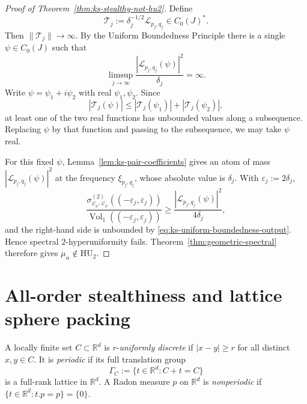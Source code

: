 \documentclass[11pt,reqno,a4paper]{amsart}
\numberwithin{equation}{section}
\theoremstyle{compact}
\theoremstyle{definition}
\theoremstyle{definition}
\newcommand{\HU}{\mathrm{HU}}
\newcommand{\Vol}{\operatorname{Vol}}
\begin{document}
\begin{proof}[Proof of Theorem~\ref{thm:ks-stealthy-not-hu2}]
Define
\begin{equation}\label{eq:ks-rescaled-functionals}
  \mathcal T_j
  :=\delta_j^{-1/2}\mathcal L_{p_j,q_j}
  \in C_0(J)^*.
\end{equation}
Then $\|\mathcal T_j\|\to\infty$.  By the Uniform Boundedness Principle
there is a single $\psi\in C_0(J)$ such that
\begin{equation}\label{eq:ks-uniform-boundedness-output}
  \limsup_{j\to\infty}
  \frac{|\mathcal L_{p_j,q_j}(\psi)|^2}{\delta_j}=\infty.
\end{equation}
Write $\psi=\psi_1+i\psi_2$ with real $\psi_1,\psi_2$.  Since
\[
  |\mathcal T_j(\psi)|
  \leq |\mathcal T_j(\psi_1)|+|\mathcal T_j(\psi_2)|,
\]
at least one of the two real functions has unbounded values along a
subsequence.  Replacing $\psi$ by that function and passing to the subsequence,
we may take $\psi$ real.

For this fixed $\psi$, Lemma~\ref{lem:ks-pair-coefficients} gives an atom of
mass $|\mathcal L_{p_j,q_j}(\psi)|^2$ at the frequency
$\xi_{p_j,q_j}$, whose absolute value is $\delta_j$.  With
$\varepsilon_j:=2\delta_j$,
\begin{equation}\label{eq:ks-normalized-pair-spectrum}
  \frac{\sigma^{(2)}_{\varphi_\psi,\varphi_\psi}
       ((-\varepsilon_j,\varepsilon_j))}
       {\Vol_1((-\varepsilon_j,\varepsilon_j))}
  \geq
  \frac{|\mathcal L_{p_j,q_j}(\psi)|^2}{4\delta_j},
\end{equation}
and the right-hand side is unbounded by
\eqref{eq:ks-uniform-boundedness-output}.  Hence spectral
$2$-hyperuniformity fails.  Theorem~\ref{thm:geometric-spectral} therefore
gives $\mu_\alpha\notin\HU_2$.
\end{proof}




\section{All-order stealthiness and lattice sphere packing}
\label{sec:all-order-stealthiness}

A locally finite set $C\subset\mathbb R^d$ is $r$-\emph{uniformly discrete}
if $|x-y|\geq r$ for all distinct $x,y\in C$.  It is \emph{periodic} if its
full translation group
\[
  \Gamma_C:=\{t\in\mathbb R^d:C+t=C\}
\]
is a full-rank lattice in $\mathbb R^d$.  A Radon measure $p$ on
$\mathbb R^d$ is \emph{nonperiodic} if
$\{t\in\mathbb R^d:t.p=p\}=\{0\}$.
\end{document}
